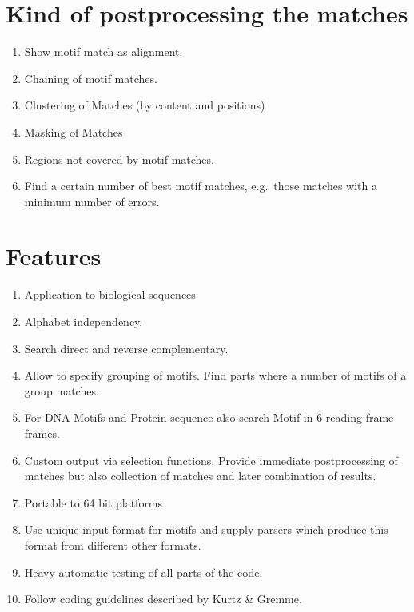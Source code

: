 \documentclass[12pt,a4paper]{article}
\begin{document}
\section{Kind of postprocessing the matches}
\begin{enumerate}
\item
Show motif match as alignment.
\item
Chaining of motif matches.
\item
Clustering of Matches (by content and positions)
\item
Masking of Matches
\item
Regions not covered by motif matches.
\item
Find a certain number of best motif matches, e.g.\ those matches 
with a minimum number of errors.
\end{enumerate}

\section{Features}
\begin{enumerate}
\item
Application to biological sequences
\item
Alphabet independency.
\item
Search direct and reverse complementary. 
\item
Allow to specify grouping of motifs. Find parts where a number of 
motifs of a group matches.
\item
For DNA Motifs and Protein sequence also search Motif in 6 reading frame
frames.
\item
Custom output via selection functions. Provide immediate postprocessing
of matches but also collection of matches and later combination 
of results.
\item
Portable to 64 bit platforms
\item
Use unique input format for motifs and supply parsers which 
produce this format from different other formats.
\item
Heavy automatic testing of all parts of the code.
\item
Follow coding guidelines described by Kurtz \& Gremme.
\end{enumerate}
\end{document}
